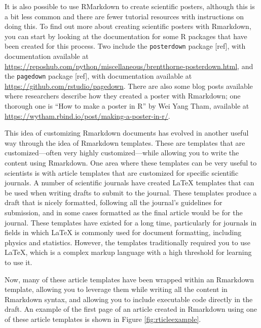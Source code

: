 \documentclass[]{tufte-book}
\begin{document}
It is also possible to use RMarkdown to create scientific posters, although this
is a bit less common and there are fewer tutorial resources with instructions on
doing this. To find out more about creating scientific posters with Rmarkdown,
you can start by looking at the documentation for some R packages that have been
created for this process. Two include the \texttt{posterdown} package {[}ref{]}, with
documentation available at
\url{https://reposhub.com/python/miscellaneous/brentthorne-posterdown.html}, and the
\texttt{pagedown} package {[}ref{]}, with documentation available at
\url{https://github.com/rstudio/pagedown}. There are also some blog posts available
where researchers describe how they created a poster with Rmarkdown; one
thorough one is ``How to make a poster in R'' by Wei Yang Tham, available at
\url{https://wytham.rbind.io/post/making-a-poster-in-r/}.

This idea of customizing Rmarkdown documents has evolved in another useful way
through the idea of Rmarkdown templates. These are templates that are
customized---often very highly customized---while allowing you to write the
content using Rmarkdown. One area where these templates can be very useful to
scientists is with article templates that are customized for specific
scientific journals. A number of scientific journals have created LaTeX
templates that can be used when writing drafts to submit to the journal.
These templates produce a draft that is nicely formatted, following all
the journal's guidelines for submission, and in some cases formatted as the
final article would be for the journal. These templates have existed for
a long time, particularly for journals in fields in which LaTeX is commonly
used for document formatting, including physics and statistics. However,
the templates traditionally required you to use LaTeX, which is a complex
markup language with a high threshold for learning to use it.

Now, many of these article templates have been wrapped within an Rmarkdown
template, allowing you to leverage them while writing all the content in
Rmarkdown syntax, and allowing you to include executable code directly in the
draft. An example of the first page of an article created in Rmarkdown using
one of these article templates is shown in Figure \ref{fig:rticleexample}.
\end{document}
